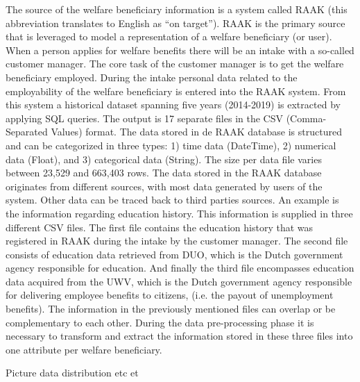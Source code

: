 The source of the welfare beneficiary information is a system called RAAK (this abbreviation translates to English as “on target”). RAAK is the primary source that is leveraged to model a representation of a welfare beneficiary (or user). When a person applies for welfare benefits there will be an intake with a so-called customer manager. The core task of the customer manager is to get the welfare beneficiary employed. During the intake personal data related to the employability of the welfare beneficiary is entered into the RAAK system. From this system a historical dataset spanning five years (2014-2019) is extracted by applying SQL queries. The output is 17 separate files in the CSV (Comma-Separated Values) format. The data stored in de RAAK database is structured and can be categorized in three types: 1) time data (DateTime), 2) numerical data (Float), and 3) categorical data (String). The size per data file varies between 23,529 and 663,403 rows.  
The data stored in the RAAK database originates from different sources, with most data generated by users of the system. Other data can be traced back to third parties sources. An example is the information regarding education history. This information is supplied in three different CSV files. The first file contains the education history that was registered in RAAK during the intake by the customer manager. The second file consists of education data retrieved from DUO, which is the Dutch government agency responsible for education. And finally the third file encompasses education data acquired from the UWV, which is the Dutch government agency responsible for delivering employee benefits to citizens, (i.e. the payout of unemployment benefits). The information in the previously mentioned files can overlap or be complementary to each other. During the data pre-processing phase it is necessary to transform and extract the information stored in these three files into one attribute per welfare beneficiary. 

Picture data distribution etc et


